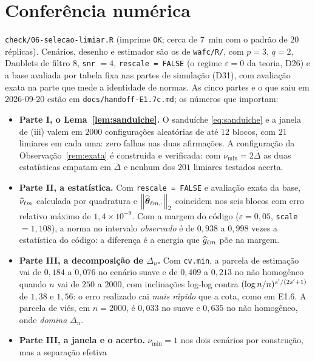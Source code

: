 \documentclass[11pt,a4paper]{article}
\newcommand{\eps}{\varepsilon}
\newcommand{\ghat}[2]{\widehat{g}_{#1#2}}
\newcommand{\Nhat}[2]{\widehat{\nu}_{#1#2}}
\newcommand{\sepmin}{\nu_{\min}}
\begin{document}
\section{Conferência numérica}

\texttt{check/06-selecao-limiar.R} (imprime \texttt{OK}; cerca de $7$~min
com o padrão de $20$ réplicas). Cenários, desenho e estimador são os de
\texttt{wafc/R/}, com $p = 3$, $q = 2$, Daublets de filtro $8$, \texttt{snr}
$= 4$, \texttt{rescale = FALSE} (o regime $\eps = 0$ da teoria, D26) e a base
avaliada por tabela fixa nas partes de simulação (D31), com avaliação exata
na parte que mede a identidade de normas. As cinco partes e o que saiu em
2026-09-20 estão em \texttt{docs/handoff-E1.7c.md}; os números que importam:

\begin{itemize}[nosep, leftmargin=*]
  \item \textbf{Parte I, o Lema~\ref{lem:sanduiche}.} O sanduíche
    \eqref{eq:sanduiche} e a janela de (iii) valem em $2000$ configurações
    aleatórias de até $12$ blocos, com $21$ limiares em cada uma: zero
    falhas nas duas afirmações. A configuração da Observação~\ref{rem:exata}
    é construída e verificada: com $\sepmin = 2\bar{\Delta}$ as duas estatísticas
    empatam em $\bar{\Delta}$ e nenhum dos $201$ limiares testados acerta.
  \item \textbf{Parte II, a estatística.} Com \texttt{rescale = FALSE} e
    avaliação exata da base, $\Nhat{\cv}{\md}$ calculada por quadratura e
    $\left\lVert \widehat{\boldsymbol{\theta}}_{\ell m,\cdot} \right\rVert_{2}$ coincidem nos seis blocos com erro
    relativo máximo de $1{,}4\times10^{-9}$. Com a margem do código
    ($\eps = 0{,}05$, \texttt{scale} $= 1{,}108$), a norma no intervalo
    \emph{observado} é de $0{,}938$ a $0{,}998$ vezes a estatística do
    código: a diferença é a energia que $\ghat{\cv}{\md}$ põe na margem.
  \item \textbf{Parte III, a decomposição de $\Delta_{n}$.} Com
    \texttt{cv.min}, a parcela de estimação vai de $0{,}184$ a $0{,}076$ no
    cenário suave e de $0{,}409$ a $0{,}213$ no não homogêneo quando $n$ vai
    de $250$ a $2000$, com inclinações log-log contra
    $(\log n/n)^{s'/(2s'+1)}$ de $1{,}38$ e $1{,}56$: o erro realizado
    cai \emph{mais rápido} que a cota, como em E1.6. A parcela de viés, em
    $n = 2000$, é $0{,}033$ no suave e $0{,}635$ no não homogêneo, onde
    \emph{domina} $\Delta_{n}$.
  \item \textbf{Parte III, a janela e o acerto.} $\sepmin = 1$ nos dois
    cenários por construção, mas a separação efetiva

\end{itemize}
\end{document}
